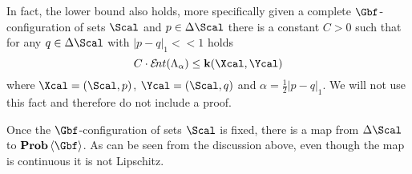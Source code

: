   In fact, the lower bound also holds, more specifically given a
  complete $\Gbf$-configuration of sets $\Scal$ and $p\in\Delta\Scal$
  there is a constant $C>0$ such that for any $q\in\Delta\Scal$ with
  $|p-q|_1<\!<1$ holds
  \[
  C\cdot\ent(\Lambda_{\alpha})\leq\ikd(\Xcal,\Ycal)
  \]      
  where $\Xcal=(\Scal,p)$, $\Ycal=(\Scal,q)$ and
  $\alpha=\frac12|p-q|_1$.
  We will not use this fact and therefore do not include a proof.

  Once the $\Gbf$-configuration of sets $\Scal$ is fixed, there is a map from $\Delta \Scal$ to $\Prob\<\Gbf>$.
  As can be seen from the discussion above, even though the map is continuous it is not Lipschitz.

